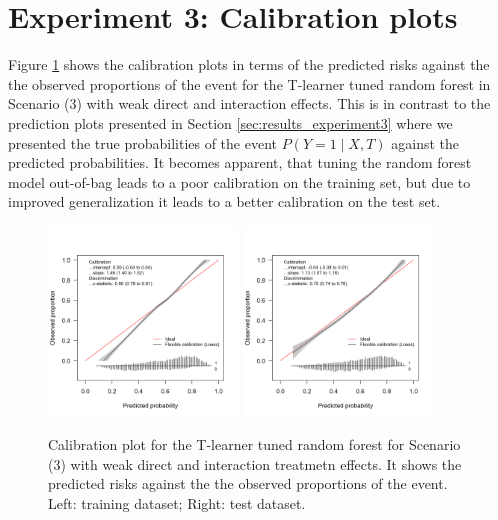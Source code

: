 \clearpage


\section{Experiment 3: Calibration plots} \label{sec:calibration_tuned_rf}

Figure \ref{fig:calibration_tuned_rf} shows the calibration plots in terms of the predicted risks against the the observed proportions of the event for the T-learner tuned random forest in Scenario (3) with weak direct and interaction effects. This is in contrast to the prediction plots presented in Section \ref{sec:results_experiment3} where we presented the true probabilities of the event $P(Y=1 \mid X, T)$ against the predicted probabilities. It becomes apparent, that tuning the random forest model out-of-bag leads to a poor calibration on the training set, but due to improved generalization it leads to a better calibration on the test set.

\begin{figure}[htbp]
\centering
\includegraphics[width=0.45\textwidth]{img/results_ITE_simulation/small_interaction_tuned_rf_tlearnertrain_calibration_plot.png}
\includegraphics[width=0.45\textwidth]{img/results_ITE_simulation/small_interaction_tuned_rf_tlearnertest_calibration_plot.png}
\caption{Calibration plot for the T-learner tuned random forest for Scenario (3) with weak direct and interaction treatmetn effects. It shows the predicted risks against the the observed proportions of the event. Left: training dataset; Right: test dataset.}
\label{fig:calibration_tuned_rf}
\end{figure}


